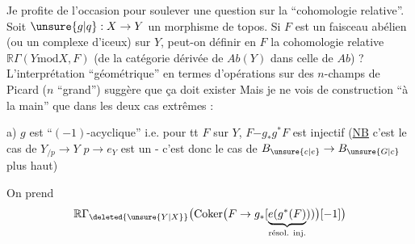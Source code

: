 
Je profite de l'occasion pour soulever une question sur la ``cohomologie relative''. Soit $\unsure{g|q}:X\to Y$ un morphisme de topos. Si $F$ est un faisceau abélien (ou un complexe d'iceux) sur $Y$, peut-on définir  en $F$ la cohomologie relative $\mathbb R\Gamma(Y\mathbin{\mathrm{mod}}X,F)$ (de la catégorie dérivée de $\mathit{Ab}(Y)$ dans celle de $\mathit{Ab}$) ? L'interprétation ``géométrique'' en termes d'opérations sur des $n$-champs de Picard ($n$ ``grand'') suggère que ça doit exister
Mais je ne vois de construction  ``à la main'' que dans les deux cas extrêmes :

a) $g$ est ``$(-1)$-acyclique'' i.e. pour tt $F$ sur $Y$, $F\mathord{-}g_{*}g^{*}F$ est injectif (\uline{NB} c'est le cas de $Y_{/p}\to Y$  $p\to e_{Y}$ est un  - c'est donc le cas de $B_{\unsure{c|e}}\to B_{\unsure{G|c}}$ plus haut)

On prend
\[
\mathbb R\Gamma_{\deleted{\unsure{Y|X}}}\bigl(\operatorname{Coker}\bigl(F\to g_{*}[\underbrace{e(g^{*}(F)}_{\text{résol. inj.}}))\bigr)[-1]\bigr)
\]
